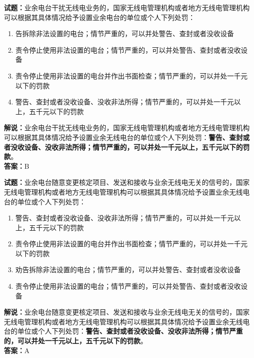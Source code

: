 \documentclass{ctexbook}
\begin{document}
\noindent\textbf{试题：}业余电台干扰无线电业务的，国家无线电管理机构或者地方无线电管理机构可以根据其具体情况给予设置业余电台的单位或个人下列处罚：
\begin{enumerate}[leftmargin=3em]
	\item  告拆除非法设置的电台；情节严重的，可以并处警告、查封或者没收设备
	\item  责令停止使用非法设置的电台；情节严重的，可以并处警告、查封或者没收设备
	\item  责令停止使用非法设置的电台并作出书面检查；情节严重的，可以并处一千元以下的罚款
	\item  警告、查封或者没收设备、没收非法所得；情节严重的，可以并处一千元以上，五千元以下的罚款
\end{enumerate}
\noindent\textbf{解说：}业余电台干扰无线电业务的，国家无线电管理机构或者地方无线电管理机构可以根据其具体情况给予设置业余无线电台的单位或个人下列处罚：\textbf{警告、查封或者没收设备、没收非法所得；情节严重的，可以并处一千元以上，五千元以下的罚款}。\\\noindent\textbf{答案：}B


\bigskip


\noindent\textbf{试题：}业余电台随意变更核定项目、发送和接收与业余无线电无关的信号的，国家无线电管理机构或者地方无线电管理机构可以根据其具体情况给予设置业余无线电台的单位或个人下列处罚：
\begin{enumerate}[leftmargin=3em]
	\item  警告、查封或者没收设备、没收非法所得；情节严重的，可以并处一千元以上，五千元以下的罚款
	\item  责令停止使用非法设置的电台并作出书面检查；情节严重的，可以并处一千元以下的罚款
	\item  劝告拆除非法设置的电台；情节严重的，可以并处警告、查封或者没收设备
	\item  责令停止使用非法设置的电台；情节严重的，可以并处警告、查封或者没收设备
\end{enumerate}
\noindent\textbf{解说：}业余电台随意变更核定项目、发送和接收与业余无线电无关的信号的，国家无线电管理机构或者地方无线电管理机构可以根据其具体情况给予设置业余无线电台的单位或个人下列处罚：\textbf{警告、查封或者没收设备、没收非法所得；情节严重的，可以并处一千元以上，五千元以下的罚款}。\\\noindent\textbf{答案：}A


\bigskip
\end{document}
